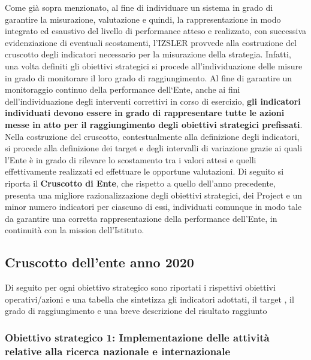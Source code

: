 \documentclass[
  12pt,
]{article}
\begin{document}
Come già sopra menzionato, al fine di individuare un sistema in grado di
garantire la misurazione, valutazione e quindi, la rappresentazione in
modo integrato ed esaustivo del livello di performance atteso e
realizzato, con successiva evidenziazione di eventuali scostamenti,
l'IZSLER provvede alla costruzione del cruscotto degli indicatori
necessario per la misurazione della strategia. Infatti, una volta
definiti gli obiettivi strategici si procede all'individuazione delle
misure in grado di monitorare il loro grado di raggiungimento. Al fine
di garantire un monitoraggio continuo della performance dell`Ente, anche
ai fini dell'individuazione degli interventi correttivi in corso di
esercizio, \textbf{gli indicatori individuati devono essere in grado di
rappresentare tutte le azioni messe in atto per il raggiungimento degli
obiettivi strategici prefissati}. Nella costruzione del cruscotto,
contestualmente alla definizione degli indicatori, si procede alla
definizione dei target e degli intervalli di variazione grazie ai quali
l'Ente è in grado di rilevare lo scostamento tra i valori attesi e
quelli effettivamente realizzati ed effettuare le opportune valutazioni.
Di seguito si riporta il \textbf{Cruscotto di Ente}, che rispetto a
quello dell'anno precedente, presenta una migliore razionalizzazione
degli obiettivi strategici, dei Project e un minor numero indicatori per
ciascuno di essi, individuati comunque in modo tale da garantire una
corretta rappresentazione della performance dell'Ente, in continuità con
la mission dell'Istituto.

\hypertarget{cruscotto-dellente-anno-2020}{%
\subsection{Cruscotto dell'ente anno
2020}\label{cruscotto-dellente-anno-2020}}

Di seguito per ogni obiettivo strategico sono riportati i rispettivi
obiettivi operativi/azioni e una tabella che sintetizza gli indicatori
adottati, il target , il grado di raggiungimento e una breve descrizione
del risultato raggiunto

\hypertarget{obiettivo-strategico-1-implementazione-delle-attivituxe0-relative-alla-ricerca-nazionale-e-internazionale}{%
\subsubsection*{\texorpdfstring{Obiettivo strategico 1:
\textbf{Implementazione delle attività relative alla ricerca nazionale e
internazionale}}{Obiettivo strategico 1: Implementazione delle attività relative alla ricerca nazionale e internazionale}}\label{obiettivo-strategico-1-implementazione-delle-attivituxe0-relative-alla-ricerca-nazionale-e-internazionale}}
\end{document}
